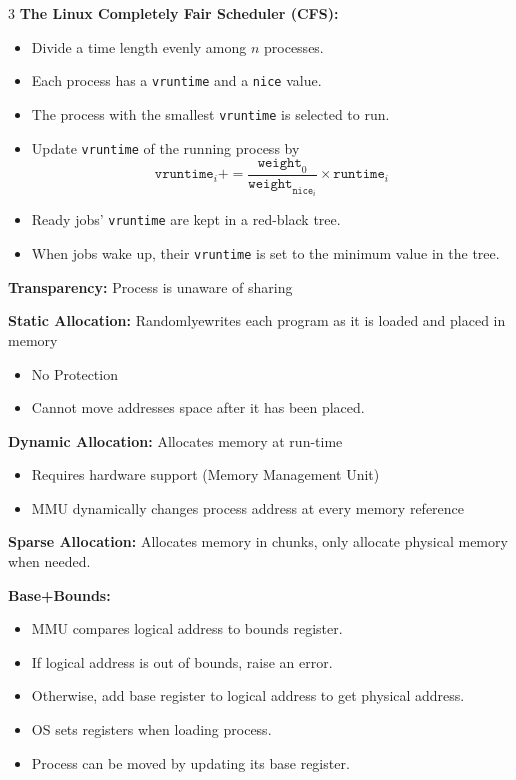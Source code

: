 \documentclass[8pt]{innovativeinnovation-cheatsheet}
\begin{document}
\begin{multicols*}{3}
\textbf{The Linux Completely Fair Scheduler (CFS):}
\begin{itemize}
      \item Divide a time length evenly among \( n \) processes. 
      \item Each process has a \texttt{vruntime} and a \texttt{nice} value.
      \item The process with the smallest \texttt{vruntime} is selected to run.
      \item Update \texttt{vruntime} of the running process by \[
            \texttt{vruntime}_i += \frac{\texttt{weight}_{0}}{\texttt{weight}_{\texttt{nice}_i}} \times \texttt{runtime}_i
      \]
      \item Ready jobs' \texttt{vruntime} are kept in a red-black tree.
      \item When jobs wake up, their \texttt{vruntime} is set to the minimum value in the tree.
      
\end{itemize}


\textbf{Transparency:} Process is unaware of sharing

\textbf{Static Allocation:} Randomlyewrites each program as it is loaded and placed in memory
\begin{itemize}
      \item No Protection
      \item Cannot move addresses space after it has been placed.
\end{itemize}

\textbf{Dynamic Allocation:} Allocates memory at run-time
\begin{itemize}
      \item Requires hardware support (Memory Management Unit)
      \item MMU dynamically changes process address at every memory reference
\end{itemize}

\textbf{Sparse Allocation:} Allocates memory in chunks, only allocate physical memory when needed.

\textbf{Base+Bounds:}
\begin{itemize}
      \item MMU compares logical address to bounds register.
      \item If logical address is out of bounds, raise an error.
      \item Otherwise, add base register to logical address to get physical address.
      \item OS sets registers when loading process.
      \item Process can be moved by updating its base register.
\end{itemize}


\end{multicols*}
\end{document}
